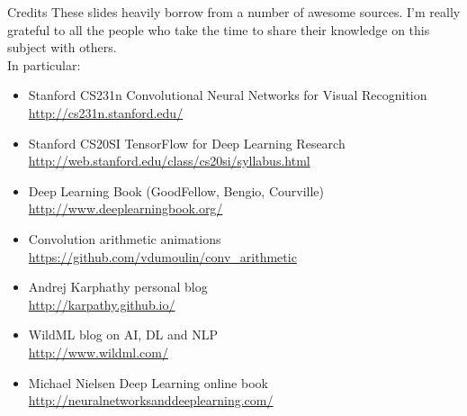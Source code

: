\begin{frame}[t, allowframebreaks]{Credits}
These slides heavily borrow from a number of awesome sources. I'm really grateful to all the people who take the time to share their knowledge on this subject with others.\\
\vspace{0.5cm}
In particular:
\begin{itemize}
\item Stanford CS231n Convolutional Neural Networks for Visual Recognition\\
\url{http://cs231n.stanford.edu/}
\item Stanford CS20SI TensorFlow for Deep Learning Research\\
\url{http://web.stanford.edu/class/cs20si/syllabus.html}
\item Deep Learning Book (GoodFellow, Bengio, Courville)\\
\url{http://www.deeplearningbook.org/}
\item Convolution arithmetic animations\\
\url{https://github.com/vdumoulin/conv_arithmetic}
\item Andrej Karphathy personal blog\\
\url{http://karpathy.github.io/}
\item WildML blog on AI, DL and NLP\\
\url{http://www.wildml.com/}
\item Michael Nielsen Deep Learning online book
\url{http://neuralnetworksanddeeplearning.com/}
\end{itemize}
\end{frame}
